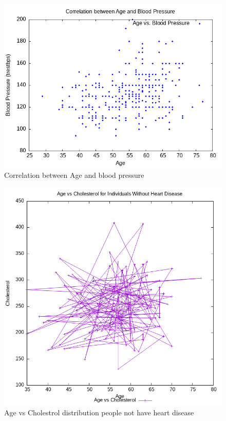 \documentclass{article}
\begin{document}
	\begin{figure}[h]
		\centering
		\caption{\label{4b}Correlation between Age and blood pressure}
		\includegraphics[scale=0.7]{4b.png}
	\end{figure}
	\begin{figure}[h]
		\centering
		\caption{\label{4c}Age vs Cholestrol distribution people not have heart disease}
		\includegraphics[scale=0.7]{4c.png}
	\end{figure}
\end{document}
